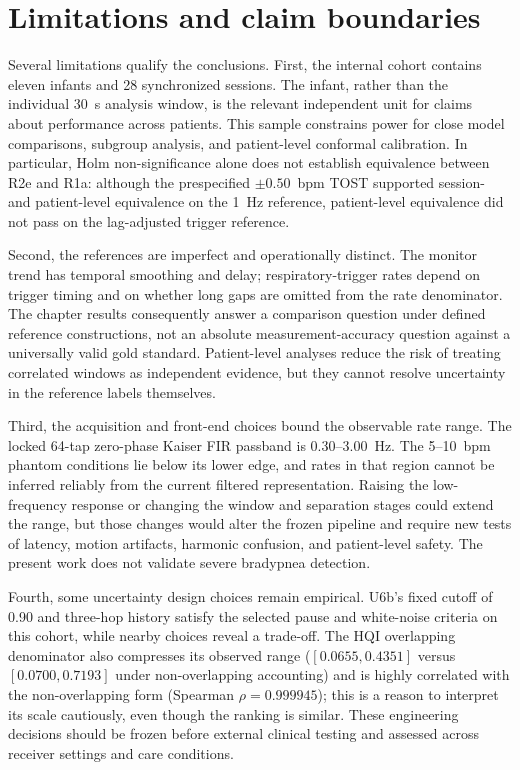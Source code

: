 \section{Limitations and claim boundaries}
\label{sec:ch7_limitations}

Several limitations qualify the conclusions. First, the internal cohort contains eleven infants
and 28 synchronized sessions. The infant, rather than the individual 30~s analysis window, is
the relevant independent unit for claims about performance across patients. This sample
constrains power for close model comparisons, subgroup analysis, and patient-level conformal
calibration. In particular, Holm non-significance alone does not establish equivalence between
R2e and R1a: although the prespecified $\pm0.50$~bpm TOST supported session- and patient-level
equivalence on the 1~Hz reference, patient-level equivalence did not pass on the lag-adjusted
trigger reference.

Second, the references are imperfect and operationally distinct. The monitor trend has temporal
smoothing and delay; respiratory-trigger rates depend on trigger timing and on whether long gaps
are omitted from the rate denominator. The chapter results consequently answer a comparison
question under defined reference constructions, not an absolute measurement-accuracy question
against a universally valid gold standard. Patient-level analyses reduce the risk of treating
correlated windows as independent evidence, but they cannot resolve uncertainty in the reference
labels themselves.

Third, the acquisition and front-end choices bound the observable rate range. The locked
64-tap zero-phase Kaiser FIR passband is 0.30--3.00~Hz. The 5--10~bpm phantom conditions lie
below its lower edge, and rates in that region cannot be inferred reliably from the current
filtered representation. Raising the low-frequency response or changing the window and
separation stages could extend the range, but those changes would alter the frozen pipeline and
require new tests of latency, motion artifacts, harmonic confusion, and patient-level safety.
The present work does not validate severe bradypnea detection.

Fourth, some uncertainty design choices remain empirical. U6b's fixed cutoff of 0.90 and
three-hop history satisfy the selected pause and white-noise criteria on this cohort, while
nearby choices reveal a trade-off. The HQI overlapping denominator also compresses its
observed range ($[0.0655, 0.4351]$ versus $[0.0700, 0.7193]$ under non-overlapping accounting)
and is highly correlated with the non-overlapping form
(Spearman $\rho=0.999945$); this is a reason to interpret its scale cautiously, even though the
ranking is similar. These engineering decisions should be frozen before external clinical
testing and assessed across receiver settings and care conditions.

